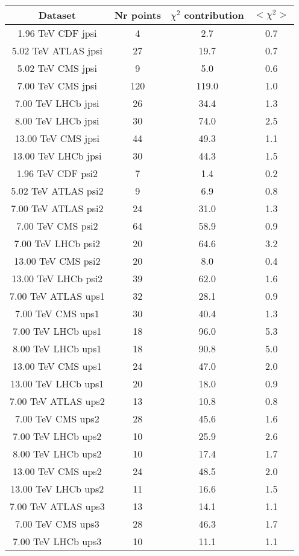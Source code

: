 \begin{table}[h!]
\centering
\begin{tabular}{c|c|c|c}
Dataset & Nr points & $\chi^2$ contribution & $<\chi^2>$ \\
\hline
1.96 TeV CDF jpsi & 4 & 2.7 & 0.7 \\
5.02 TeV ATLAS jpsi & 27 & 19.7 & 0.7 \\
5.02 TeV CMS jpsi & 9 & 5.0 & 0.6 \\
7.00 TeV CMS jpsi & 120 & 119.0 & 1.0 \\
7.00 TeV LHCb jpsi & 26 & 34.4 & 1.3 \\
8.00 TeV LHCb jpsi & 30 & 74.0 & 2.5 \\
13.00 TeV CMS jpsi & 44 & 49.3 & 1.1 \\
13.00 TeV LHCb jpsi & 30 & 44.3 & 1.5 \\
1.96 TeV CDF psi2 & 7 & 1.4 & 0.2 \\
5.02 TeV ATLAS psi2 & 9 & 6.9 & 0.8 \\
7.00 TeV ATLAS psi2 & 24 & 31.0 & 1.3 \\
7.00 TeV CMS psi2 & 64 & 58.9 & 0.9 \\
7.00 TeV LHCb psi2 & 20 & 64.6 & 3.2 \\
13.00 TeV CMS psi2 & 20 & 8.0 & 0.4 \\
13.00 TeV LHCb psi2 & 39 & 62.0 & 1.6 \\
7.00 TeV ATLAS ups1 & 32 & 28.1 & 0.9 \\
7.00 TeV CMS ups1 & 30 & 40.4 & 1.3 \\
7.00 TeV LHCb ups1 & 18 & 96.0 & 5.3 \\
8.00 TeV LHCb ups1 & 18 & 90.8 & 5.0 \\
13.00 TeV CMS ups1 & 24 & 47.0 & 2.0 \\
13.00 TeV LHCb ups1 & 20 & 18.0 & 0.9 \\
7.00 TeV ATLAS ups2 & 13 & 10.8 & 0.8 \\
7.00 TeV CMS ups2 & 28 & 45.6 & 1.6 \\
7.00 TeV LHCb ups2 & 10 & 25.9 & 2.6 \\
8.00 TeV LHCb ups2 & 10 & 17.4 & 1.7 \\
13.00 TeV CMS ups2 & 24 & 48.5 & 2.0 \\
13.00 TeV LHCb ups2 & 11 & 16.6 & 1.5 \\
7.00 TeV ATLAS ups3 & 13 & 14.1 & 1.1 \\
7.00 TeV CMS ups3 & 28 & 46.3 & 1.7 \\
7.00 TeV LHCb ups3 & 10 & 11.1 & 1.1 \\

\end{tabular}
\end{table}
